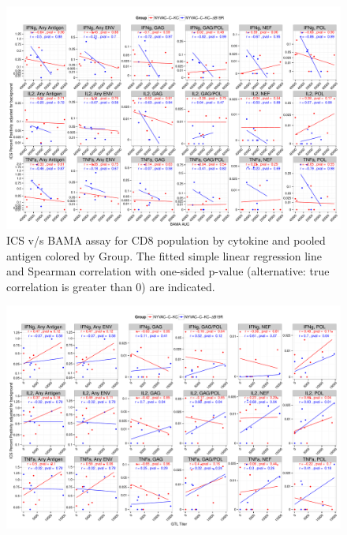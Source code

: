 \documentclass[11pt]{article}\usepackage[]{graphicx}\usepackage[]{color}
\makeatletter
\def\maxwidth{ %
  \ifdim\Gin@nat@width>\linewidth
    \linewidth
  \else
    \Gin@nat@width
  \fi
}
\newenvironment{knitrout}{}{} %
\makeatother
\begin{document}
\begin{landscape}
\begin{figure}[H]
\begin{center}
\begin{knitrout}
\color{fgcolor}
\includegraphics[width=\maxwidth]{figure/corrplot_CD8_BAMA_pooledAntigen-1} 

\end{knitrout}
\caption{ICS v/s BAMA assay for CD8 population by cytokine and pooled antigen colored by Group. The fitted simple linear regression line and Spearman correlation with one-sided p-value (alternative: true correlation is greater than 0) are indicated.}
\end{center}
\end{figure}


\begin{figure}[H]
\begin{center}
\begin{knitrout}
\color{fgcolor}
\includegraphics[width=\maxwidth]{figure/corrplot_CD4_ADCC_pooledAntigen-1} 


\end{knitrout}
\end{center}
\end{figure}
\end{landscape}
\end{document}
